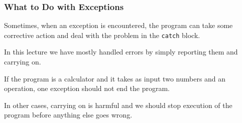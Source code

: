\begin{frame}
\frametitle{What to Do with Exceptions}

Sometimes, when an exception is encountered, the program can take some corrective action and deal with the problem in the \texttt{catch} block.

In this lecture we have mostly handled errors by simply reporting them and carrying on.

If the program is a calculator and it takes as input two numbers and an operation, one exception should not end the program.

In other cases, carrying on is harmful and we should stop execution of the program before anything else goes wrong.

\end{frame}






